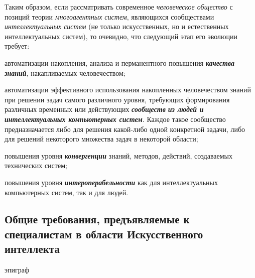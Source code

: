 Таким образом, если рассматривать современное \textit{человеческое общество} с позиций теории \textit{многоагентных систем}, являющихся сообществами \textit{интеллектуальных систем} (не только искусственных, но и естественных интеллектуальных систем), то очевидно, что следующий этап его эволюции требует:
\begin{textitemize}
	\item автоматизации накопления, анализа и перманентного повышения \textbf{\textit{качества знаний}}, накапливаемых человечеством;
	\item автоматизации эффективного использования накопленных человечеством знаний при решении задач самого различного уровня, требующих формирования различных временных или действующих \textbf{\textit{сообществ}} \textbf{\textit{из людей и интеллектуальных компьютерных систем}}. Каждое такое сообщество предназначается либо для решения какой-либо одной конкретной задачи, либо для решений некоторого множества задач в некоторой области;
	\item повышения уровня \textbf{\textit{конвергенции}} знаний, методов, действий, создаваемых технических систем;
	\item повышения уровня \textbf{\textit{интероперабельности}} как для интеллектуальных компьютерных систем, так и для людей.
\end{textitemize}

\subsection*{Общие требования, предъявляемые к специалистам в области Искусственного интеллекта}

\begin{SCn}
	\begin{scnrelfromlist}{эпиграф}
	\end{scnrelfromlist}
\end{SCn}


